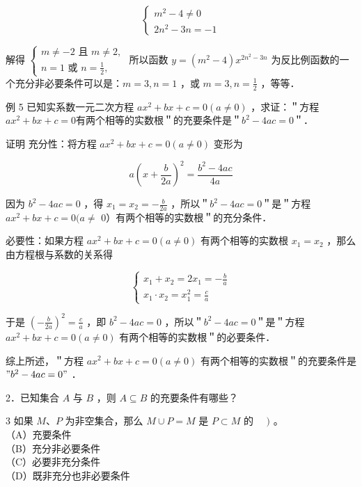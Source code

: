 \documentclass[10pt]{article}
\begin{document}
\[
\left\{\begin{array}{l}
m^{2}-4 \neq 0 \\
2 n^{2}-3 n=-1
\end{array}\right.
\]

解得 \(\left\{\begin{array}{l}m \neq-2 \text { 且 } m \neq 2, \\ n=1 \text { 或 } n=\frac{1}{2},\end{array}\right.\) 所以函数 \(y=\left(m^{2}-4\right) x^{2 n^{2}-3 n}\) 为反比例函数的一个充分非必要条件可以是：\(m=3, n=1\) ，或 \(m=3, n=\frac{1}{2}\) ，等等．

例 5 已知实系数一元二次方程 \(a x^{2}+b x+c=0(a \neq 0)\) ，求证：＂方程 \(a x^{2}+b x+c=0\)有两个相等的实数根＂的充要条件是＂\(b^{2}-4 a c=0\)＂．

证明 充分性：将方程 \(a x^{2}+b x+c=0(a \neq 0)\) 变形为

\[
a\left(x+\frac{b}{2 a}\right)^{2}=\frac{b^{2}-4 a c}{4 a}
\]

因为 \(b^{2}-4 a c=0\) ，得 \(x_{1}=x_{2}=-\frac{b}{2 a}\) ，所以＂\(b^{2}-4 a c=0\)＂是＂方程 \(a x^{2}+b x+c=0(a \neq\) 0）有两个相等的实数根＂的充分条件．

必要性：如果方程 \(a x^{2}+b x+c=0(a \neq 0)\) 有两个相等的实数根 \(x_{1}=x_{2}\) ，那么由方程根与系数的关系得

\[
\left\{\begin{array}{l}
x_{1}+x_{2}=2 x_{1}=-\frac{b}{a} \\
x_{1} \cdot x_{2}=x_{1}^{2}=\frac{c}{a}
\end{array}\right.
\]

于是 \(\left(-\frac{b}{2 a}\right)^{2}=\frac{c}{a}\) ，即 \(b^{2}-4 a c=0\) ，所以＂\(b^{2}-4 a c=0\)＂是＂方程 \(a x^{2}+b x+c=0(a \neq 0)\) 有两个相等的实数根＂的必要条件．

综上所述，＂方程 \(a x^{2}+b x+c=0(a \neq 0)\) 有两个相等的实数根＂的充要条件是 \(" b^{2}-4 a c=0 "\) ．

2．已知集合 \(A\) 与 \(B\) ，则 \(A \subseteq B\) 的充要条件有哪些？

3 如果 \(M 、 P\) 为非空集合，那么 \(M \cup P=M\) 是 \(P \subset M\) 的 \(\quad)\) 。\\
（A）充要条件\\
（B）充分非必要条件\\
（C）必要非充分条件\\
（D）既非充分也非必要条件
\end{document}
